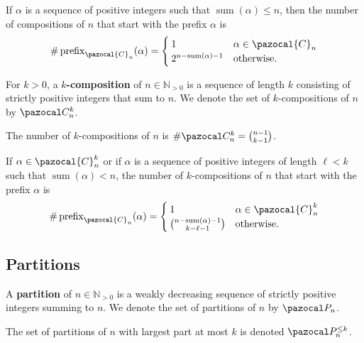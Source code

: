 \begin{proposition}
  If $\alpha$ is a sequence of positive integers such that
  $\operatorname{sum}(\alpha) \leq n$, then
  the number of compositions of $n$ that start with the prefix $\alpha$
  is \begin{equation}
    \#\operatorname{prefix}_{\pazocal{C}_n}(\alpha) = \begin{cases}
      1 & \alpha \in \pazocal{C}_n \\
      2^{n - \operatorname{sum}(\alpha) - 1} & \text{otherwise}.
    \end{cases}
  \end{equation}
\end{proposition}

\begin{definition}
  For $k > 0$, a $k$\textbf{-composition} of $n \in \mathbb{N}_{>0}$
  is a sequence of length $k$ consisting of strictly positive integers that sum
  to $n$. We denote the set of $k$-compositions of $n$ by $\pazocal C_n^{k}$.
\end{definition}

\begin{lemma}
  The number of $k$-compositions of $n$ is $\#\pazocal C_n^{k} = \binom{n-1}{k-1}$.
\end{lemma}

\begin{proposition}
  If $\alpha \in \pazocal{C}_n^{k}$ or if $\alpha$ is
  a sequence of positive integers of length $\ell < k$ such that
  ${\operatorname{sum}(\alpha) < n}$,
  the number of $k$-compositions of $n$ that start with the prefix $\alpha$
  is \begin{equation}
    \#\operatorname{prefix}_{\pazocal{C}_n}(\alpha) = \begin{cases}
      1 & \alpha \in \pazocal{C}_n^{k} \\
      \binom{n - \operatorname{sum}(\alpha) - 1}{k - \ell - 1} & \text{otherwise}.
    \end{cases}
  \end{equation}
\end{proposition}

\subsection{Partitions}
\begin{definition}
  A \textbf{partition} of $n \in \mathbb{N}_{>0}$ is a weakly decreasing
  sequence of strictly positive integers summing to $n$. We denote the set of
  partitions of $n$ by $\pazocal P_n$.

  The set of partitions of $n$ with largest part at most
  $k$ is denoted $\pazocal P_n^{\leq k}$.
\end{definition}

